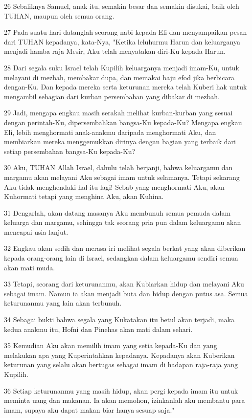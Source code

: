 \par 26 Sebaliknya Samuel, anak itu, semakin besar dan semakin disukai, baik oleh TUHAN, maupun oleh semua orang.
\par 27 Pada suatu hari datanglah seorang nabi kepada Eli dan menyampaikan pesan dari TUHAN kepadanya, kata-Nya, "Ketika leluhurmu Harun dan keluarganya menjadi hamba raja Mesir, Aku telah menyatakan diri-Ku kepada Harun.
\par 28 Dari segala suku Israel telah Kupilih keluarganya menjadi imam-Ku, untuk melayani di mezbah, membakar dupa, dan memakai baju efod jika berbicara dengan-Ku. Dan kepada mereka serta keturunan mereka telah Kuberi hak untuk mengambil sebagian dari kurban persembahan yang dibakar di mezbah.
\par 29 Jadi, mengapa engkau masih serakah melihat kurban-kurban yang sesuai dengan perintah-Ku, dipersembahkan bangsa-Ku kepada-Ku? Mengapa engkau Eli, lebih menghormati anak-anakmu daripada menghormati Aku, dan membiarkan mereka menggemukkan dirinya dengan bagian yang terbaik dari setiap persembahan bangsa-Ku kepada-Ku?
\par 30 Aku, TUHAN Allah Israel, dahulu telah berjanji, bahwa keluargamu dan margamu akan melayani Aku sebagai imam untuk selamanya. Tetapi sekarang Aku tidak menghendaki hal itu lagi! Sebab yang menghormati Aku, akan Kuhormati tetapi yang menghina Aku, akan Kuhina.
\par 31 Dengarlah, akan datang masanya Aku membunuh semua pemuda dalam keluarga dan margamu, sehingga tak seorang pria pun dalam keluargamu akan mencapai usia lanjut.
\par 32 Engkau akan sedih dan merasa iri melihat segala berkat yang akan diberikan kepada orang-orang lain di Israel, sedangkan dalam keluargamu sendiri semua akan mati muda.
\par 33 Tetapi, seorang dari keturunanmu, akan Kubiarkan hidup dan melayani Aku sebagai imam. Namun ia akan menjadi buta dan hidup dengan putus asa. Semua keturunanmu yang lain akan terbunuh.
\par 34 Sebagai bukti bahwa segala yang Kukatakan itu betul akan terjadi, maka kedua anakmu itu, Hofni dan Pinehas akan mati dalam sehari.
\par 35 Kemudian Aku akan memilih imam yang setia kepada-Ku dan yang melakukan apa yang Kuperintahkan kepadanya. Kepadanya akan Kuberikan keturunan yang selalu akan bertugas sebagai imam di hadapan raja-raja yang Kupilih.
\par 36 Setiap keturunanmu yang masih hidup, akan pergi kepada imam itu untuk meminta uang dan makanan. Ia akan memohon, izinkanlah aku membantu para imam, supaya aku dapat makan biar hanya sesuap saja."

